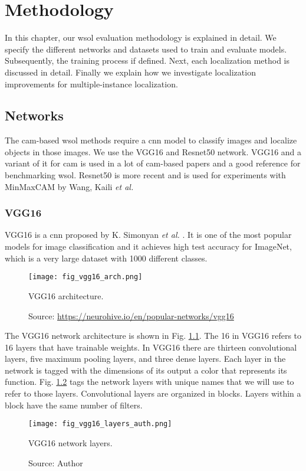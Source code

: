 \chapter{Methodology} \label{ch:methodology}

In this chapter, our \acrshort{wsol} evaluation methodology is explained in detail. We specify the different networks and datasets used to train and evaluate models. Subsequently, the training process if defined. Next, each localization method is discussed in detail. Finally we explain how we investigate localization improvements for multiple-instance localization.

\section{Networks}
The \acrshort{cam}-based \acrshort{wsol} methods require a \acrshort{cnn} model to classify images and localize objects in those images. We use the VGG16 and Resnet50 network. VGG16 and a variant of it for \acrshort{cam} is used in a lot of \acrshort{cam}-based papers and a good reference for benchmarking \acrshort{wsol}. Resnet50 is more recent and is used for experiments with MinMaxCAM by Wang, Kaili \textit{et al.}

\subsection{VGG16}
VGG16 is a \acrshort{cnn} proposed by K. Simonyan \textit{et al.} \cite{simonyan2014very}. It is one of the most popular models for image classification and it achieves high test accuracy for ImageNet, which is a very large dataset with 1000 different classes.
\begin{figure}[ht]
    \begin{center}       
    \texttt{[image: fig\_vgg16\_arch.png]}
    \caption[VGG16 architecture]{VGG16 architecture.}
    \caption*{Source: \href{https://neurohive.io/en/popular-networks/vgg16}{https://neurohive.io/en/popular-networks/vgg16}}
    \label{fig:vgg16_arch}
    \end{center}
\end{figure}

The VGG16 network architecture is shown in Fig. \ref{fig:vgg16_arch}. The 16 in VGG16 refers to 16 layers that have trainable weights. In VGG16 there are thirteen convolutional layers, five maximum pooling layers, and three dense layers. Each layer in the network is tagged with the dimensions of its output a color that represents its function. Fig. \ref{fig:vgg16_layers_auth} tags the network layers with unique names that we will use to refer to those layers. Convolutional layers are organized in blocks. Layers within a block have the same number of filters.
\begin{figure}[ht]
    \begin{center}       
    \texttt{[image: fig\_vgg16\_layers\_auth.png]}
    \caption[VGG16 network layers]{VGG16 network layers.}
    \caption*{Source: Author}
    \label{fig:vgg16_layers_auth}
    \end{center}
\end{figure}

